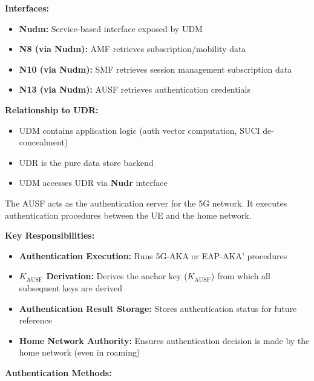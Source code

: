 \textbf{Interfaces:}

\begin{itemize}
\tightlist
\item
  \textbf{Nudm:} Service-based interface exposed by UDM
\item
  \textbf{N8 (via Nudm):} AMF retrieves subscription/\allowbreak{}mobility data
\item
  \textbf{N10 (via Nudm):} SMF retrieves session management subscription data
\item
  \textbf{N13 (via Nudm):} AUSF retrieves authentication credentials
\end{itemize}

\textbf{Relationship to UDR:}

\begin{itemize}
\tightlist
\item
  UDM contains application logic (auth vector computation, SUCI de-concealment)
\item
  UDR is the pure data store backend
\item
  UDM accesses UDR via \textbf{Nudr} interface
\end{itemize}


The AUSF acts as the authentication server for the 5G network. It executes authentication procedures between the UE and the home network.

\textbf{Key Responsibilities:}

\begin{itemize}
\tightlist
\item
  \textbf{Authentication Execution:} Runs 5G-AKA or EAP-AKA’ procedures
\item
  \textbf{\ensuremath{K_{\mathrm{AUSF}}} Derivation:} Derives the anchor key (\ensuremath{K_{\mathrm{AUSF}}}) from which all subsequent keys are derived
\item
  \textbf{Authentication Result Storage:} Stores authentication status for future reference
\item
  \textbf{Home Network Authority:} Ensures authentication decision is made by the home network (even in roaming)
\end{itemize}


\textbf{Authentication Methods:}

